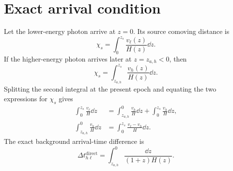 \section{Exact arrival condition}
Let the lower-energy photon arrive at \(z=0\). Its source comoving distance is
\begin{equation}
\chi_s
=\int_0^{z_s}\frac{v_\ell(z)}{H(z)}\dd z.
\end{equation}
If the higher-energy photon arrives later at \(z=z_{a,h}<0\), then
\begin{equation}
\chi_s
=\int_{z_{a,h}}^{z_s}\frac{v_h(z)}{H(z)}\dd z.
\end{equation}
Splitting the second integral at the present epoch and equating the two expressions for \(\chi_s\) gives
\begin{align}
\int_0^{z_s}\frac{v_\ell}{H}\dd z
&=\int_{z_{a,h}}^0\frac{v_h}{H}\dd z
+\int_0^{z_s}\frac{v_h}{H}\dd z,\\
\int_{z_{a,h}}^0\frac{v_h}{H}\dd z
&=\int_0^{z_s}\frac{v_\ell-v_h}{H}\dd z.
\end{align}
The exact background arrival-time difference is
\begin{equation}
\Delta t_{h\ell}^{\mathrm{direct}}
=\int_{z_{a,h}}^0
\frac{\dd z}{(1+z)H(z)}.
\end{equation}

